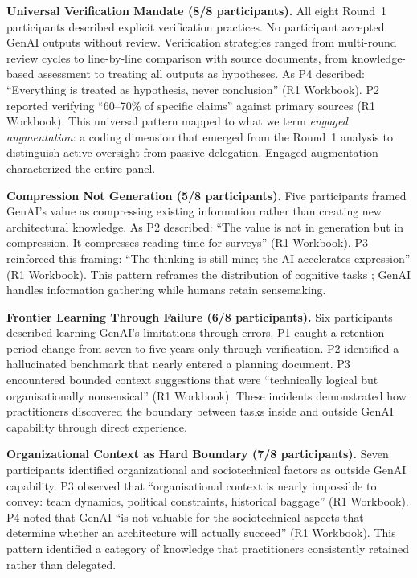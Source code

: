 \textbf{Universal Verification Mandate (8/8 participants).} All eight Round~1
participants described explicit verification practices. No participant accepted
GenAI outputs without review. Verification strategies ranged from multi-round
review cycles to line-by-line comparison with source documents, from
knowledge-based assessment to treating all outputs as hypotheses. As P4
described: ``Everything is treated as hypothesis, never conclusion'' (R1
Workbook). P2 reported verifying ``60--70\% of specific claims'' against
primary sources (R1 Workbook). This universal pattern mapped to what we term \emph{engaged
augmentation}: a coding dimension that emerged from the Round~1 analysis to
distinguish active oversight from passive delegation. Engaged augmentation
characterized the entire panel.

\textbf{Compression Not Generation (5/8 participants).} Five participants framed
GenAI's value as compressing existing information rather than creating new
architectural knowledge. As P2 described: ``The value is not in generation
but in compression. It compresses reading time for surveys'' (R1 Workbook).
P3 reinforced this framing: ``The thinking is still mine; the AI accelerates
expression'' (R1 Workbook). This pattern reframes the distribution of cognitive tasks
\parencite{hutchins_cognition_1995}; GenAI handles information gathering while
humans retain sensemaking.

\textbf{Frontier Learning Through Failure (6/8 participants).} Six participants
described learning GenAI's limitations through errors. P1 caught a retention
period change from seven to five years only through verification. P2
identified a hallucinated benchmark that nearly entered a planning document.
P3 encountered bounded context suggestions that were ``technically logical but
organisationally nonsensical'' (R1 Workbook). These incidents demonstrated how
practitioners discovered the boundary between tasks inside and outside GenAI
capability through direct experience.

\textbf{Organizational Context as Hard Boundary (7/8 participants).} Seven
participants identified organizational and sociotechnical factors as outside
GenAI capability. P3 observed that ``organisational context is nearly
impossible to convey: team dynamics, political constraints, historical baggage''
(R1 Workbook). P4 noted that GenAI ``is not valuable for the sociotechnical
aspects that determine whether an architecture will actually succeed'' (R1
Workbook). This pattern identified a category of knowledge that practitioners
consistently retained rather than delegated.

